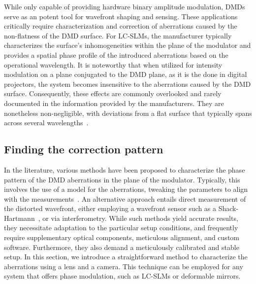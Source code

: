 \documentclass[12pt]{iopart}
\begin{document}
While only capable of providing hardware binary amplitude modulation,
DMDs serve as an potent tool for wavefront shaping and sensing.
These applications  critically require characterization and correction of aberrations
caused by the non-flatness of the DMD surface.
For LC-SLMs, the manufacturer typically characterizes the surface's inhomogeneities within the plane of the modulator and
provides a spatial phase profile of the introduced aberrations based on the operational wavelength.
It is noteworthy that when utilized for intensity modulation on a plane conjugated to the DMD plane,
as it is the done in digital projectors,
the system becomes insensitive to the aberrations caused by the DMD surface.
Consequently, these effects are commonly overlooked and rarely documented in the information provided by the manufacturers.
They are nonetheless non-negligible, with deviations from a flat surface
that typically spans across several wavelengths~\cite{Brown2021multicolor}.\\



\subsection{Finding the correction pattern}

In the literature, various methods have been proposed to characterize
the phase pattern of the DMD aberrations in the plane of the modulator.
Typically, this involves the use of a model for the aberrations,
tweaking the parameters to align with the measurements~\cite{Matthes2019Optical,Scholes2019structured, Brown2021multicolor}.
An alternative approach entails direct measurement of the distorted wavefront,
either employing a wavefront sensor such as a Shack-Hartmann~\cite{Lee2023compensation},
or via interferometry.
While such methods yield accurate results,
they necessitate adaptation to the particular
setup conditions,
and frequently require supplementary optical components,
meticulous alignment,
and custom software.
Furthermore, they also demand
a meticulously calibrated and stable setup.
In this section, we introduce a straightforward method to characterize the aberrations using a lens and a camera.
This technique can be employed for any system that offers phase modulation,
such as LC-SLMs or deformable mirrors. \\
\end{document}
